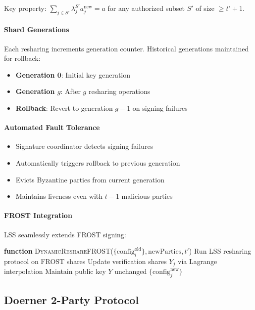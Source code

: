 Key property: $\sum_{j \in S'} \lambda_j^{S'} a_j^{\text{new}} = a$ for any authorized subset $S'$ of size $\geq t'+1$.

\paragraph{Shard Generations} Each resharing increments generation counter. Historical generations maintained for rollback:
\begin{itemize}
\item \textbf{Generation 0}: Initial key generation
\item \textbf{Generation $g$}: After $g$ resharing operations
\item \textbf{Rollback}: Revert to generation $g-1$ on signing failures
\end{itemize}

\paragraph{Automated Fault Tolerance}
\begin{itemize}
\item Signature coordinator detects signing failures
\item Automatically triggers rollback to previous generation
\item Evicts Byzantine parties from current generation
\item Maintains liveness even with $t-1$ malicious parties
\end{itemize}

\paragraph{FROST Integration} LSS seamlessly extends FROST signing:
\begin{algorithmic}[1]
\State \textbf{function} \textsc{DynamicReshareFROST}($\{\text{config}_i^{\text{old}}\}, \text{newParties}, t'$)
\State Run LSS resharing protocol on FROST shares
\State Update verification shares $Y_j$ via Lagrange interpolation
\State Maintain public key $Y$ unchanged
\State \Return $\{\text{config}_j^{\text{new}}\}$

\end{algorithmic}

\subsection{Doerner 2-Party Protocol}

